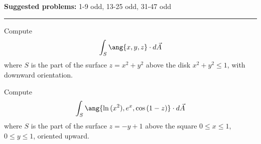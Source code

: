\documentclass[12pt,reqno]{amsart}
\begin{document}
\textbf{Suggested problems:} 1-9 odd, 13-25 odd, 31-47 odd

\bigskip
\hrule

\bigskip

\prob Compute
	\[\int_S \ang{x,y,z} \cdot d \vec{A}
	\]
where $S$ is the part of the surface $z=x^2+y^2$ above the disk $x^2+y^2 \leq 1$, with downward orientation.

\vfill
\prob Compute
	\[\int_S \ang{\ln{(x^2)}, e^x, \cos{(1-z)}} \cdot d\vec{A}
	\]
where $S$ is the part of the surface $z=-y+1$ above the square $0 \leq x\leq 1$, $0\leq y \leq 1$, oriented upward.

\vfill
\end{document}

